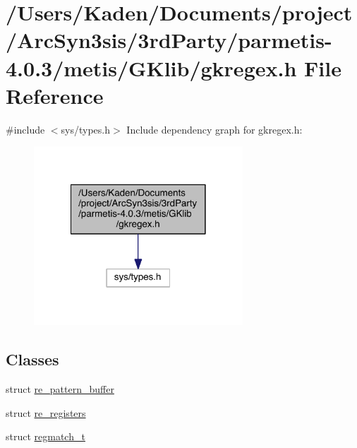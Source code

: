 \hypertarget{a00092}{}\section{/\+Users/\+Kaden/\+Documents/project/\+Arc\+Syn3sis/3rd\+Party/parmetis-\/4.0.3/metis/\+G\+Klib/gkregex.h File Reference}
\label{a00092}
{\ttfamily \#include $<$sys/types.\+h$>$}\newline
Include dependency graph for gkregex.\+h\+:\nopagebreak
\begin{figure}[H]
\begin{center}
\leavevmode
\includegraphics[width=222pt]{a00093}
\end{center}
\end{figure}
\subsection*{Classes}
\begin{DoxyCompactItemize}
\item 
struct \hyperlink{a00686}{re\+\_\+pattern\+\_\+buffer}
\item 
struct \hyperlink{a00690}{re\+\_\+registers}
\item 
struct \hyperlink{a00694}{regmatch\+\_\+t}
\end{DoxyCompactItemize}
